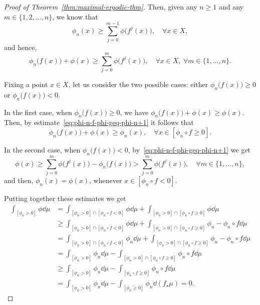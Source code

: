 \begin{proof}[Proof of Theorem~\ref{thm:maximal-ergodic-thm}]
  Then, given any $n\geq 1$ and any $m\in\{1,2,\ldots,n\}$, we know that
  \begin{displaymath}
    \phi_n(x)\geq \sum_{j=0}^{m-1}\phi\big(f^j(x)\big), \quad\forall x\in X,
  \end{displaymath}
  and hence,
  \begin{equation}
    \label{eq:phi-n-f-phi-geq-phi-n+1}
    \phi_n\big(f(x)\big) + \phi(x) \geq \sum_{j=0}^m\phi\big(f^j(x)\big), \quad\forall x\in X,\ \forall m\in\{1,\ldots,n\}.
  \end{equation}

  Fixing a point $x\in X$, let us consider the two possible cases: either $\phi_n\big(f(x)\big)\geq 0$ or $\phi_n\big(f(x)\big)< 0$.

  In the first case, when $\phi_n\big(f(x)\big)\geq 0$, we have $\phi_n\big(f(x)\big)+\phi(x)\geq \phi(x)$. Then, by estimate~\eqref{eq:phi-n-f-phi-geq-phi-n+1} it follows that
  \begin{displaymath}
    \phi_n\big(f(x)\big)+ \phi(x)\geq \phi_n(x), \quad\forall x\in [\phi_n\circ f\geq 0].
  \end{displaymath}

  In the second case, when $\phi_n\big(f(x)\big)<0$, by~\eqref{eq:phi-n-f-phi-geq-phi-n+1} we get
  \begin{displaymath}
    \phi(x)\geq \sum_{j=0}^m\phi\big(f^j(x)\big) - \phi_n\big(f(x)\big) > \sum_{j=0}^m\phi\big(f^j(x)\big), \quad\forall m\in\{1,\ldots,n\},
  \end{displaymath}
  and then, $\phi_n(x)=\phi(x)$, whenever $x\in [\phi_n\circ f<0]$.

  Putting together these estimates we get
  \begin{displaymath}
    \begin{split}
      \int_{[\phi_n>0]}\phi\dd\mu &= \int_{[\phi_n>0]\cap [\phi_n\circ f<0]}\phi\dd\mu + \int_{[\phi_n>0]\cap [\phi_n\circ f\geq 0]}\phi\dd\mu \\
      &\geq \int_{[\phi_n>0]\cap [\phi_n\circ f<0]}\phi\dd\mu + \int_{[\phi_n>0]\cap [\phi_n\circ f\geq 0]}\phi_n-\phi_n\circ f\dd\mu \\
      &= \int_{[\phi_n>0]\cap [\phi_n\circ f<0]}\phi_n\dd\mu + \int_{[\phi_n>0]\cap [\phi_n\circ f\geq 0]}\phi_n-\phi_n\circ f\dd\mu \\
      &= \int_{[\phi_n>0]}\phi_n\dd\mu - \int_{[\phi_n>0]\cap [\phi_n\circ f\geq 0]}\phi_n\circ f\dd\mu \\
      &\geq \int_{[\phi_n>0]}\phi_n\dd\mu - \int_{[\phi_n\circ f\geq 0]}\phi_n\circ f\dd\mu \\
      &= \int_{[\phi_n>0]}\phi_n\dd\mu - \int_{[\phi_n\geq 0]}\phi_n\dd(f_\star\mu) = 0.
    \end{split}
  \end{displaymath}
\end{proof}

